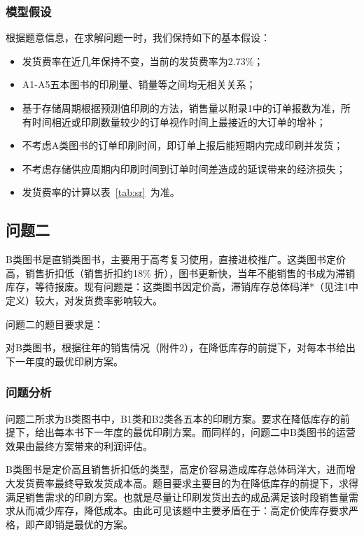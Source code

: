 \documentclass[bwprint]{gmcmthesis}
\begin{document}
\subsubsection{模型假设}

根据题意信息，在求解问题一时，我们保持如下的基本假设：

\begin{itemize}
	\item 发货费率在近几年保持不变，当前的发货费率为2.73\%；
	\item A1-A5五本图书的印刷量、销量等之间均无相关关系；
	\item 基于存储周期根据预测值印刷的方法，销售量以附录1中的订单报数为准，所有时间相近或印刷数量较少的订单视作时间上最接近的大订单的增补；
	\item 不考虑A类图书的订单印刷时间，即订单上报后能短期内完成印刷并发货；
	\item 不考虑存储供应周期内印刷时间到订单时间差造成的延误带来的经济损失；
	\item 发货费率的计算以表~\ref{tab:sr}~为准。
\end{itemize}

\subsection{问题二}

B类图书是直销类图书，主要用于高考复习使用，直接进校推广。这类图书定价高，销售折扣低（销售折扣约18\% 折），图书更新快，当年不能销售的书成为滞销库存，等待报废。现有问题是：这类图书因定价高，滞销库存总体码洋*（见注1中定义）较大，对发货费率影响较大。

问题二的题目要求是：

对B类图书，根据往年的销售情况（附件2），在降低库存的前提下，对每本书给出下一年度的最优印刷方案。

\subsubsection{问题分析}

问题二所求为B类图书中，B1类和B2类各五本的印刷方案。要求在降低库存的前提下，给出每本书下一年度的最优印刷方案。而同样的，问题二中B类图书的运营效果由最终方案带来的利润评估。

B类图书是定价高且销售折扣低的类型，高定价容易造成库存总体码洋大，进而增大发货费率最终导致发货成本高。题目要求主要目的为在降低库存的前提下，求得满足销售需求的印刷方案。也就是尽量让印刷发货出去的成品满足该时段销售量需求从而减少库存，降低成本。由此可见该题中主要矛盾在于：高定价使库存要求严格，即产即销是最优的方案。
\end{document}
